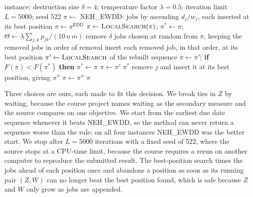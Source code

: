 \begin{algorithm}[ht]
\caption{Iterated greedy for weighted tardiness, after Ruiz and St\"utzle~\cite{ruiz2008igwt}. $F = (Z, W)$ is compared lexicographically, and every insertion goes to the best position.}
\label{alg:ig}
\small
\begin{algorithmic}[1]
\Require instance; destruction size $\delta = 4$; temperature factor $\lambda = 0.5$; iteration limit $L = 5000$; seed 522
\State $\pi \gets$ NEH\_EWDD: jobs by ascending $d_j / w_j$, each inserted at its best position
 $\pi \gets \pi^{\mathrm{EDD}}$ \EndIf
\State $\pi \gets \textsc{LocalSearch}(\pi)$; \quad $\pi^{*} \gets \pi$; \quad $\Theta \gets \lambda \sum_{j,k} p_{jk} / (10\, n\, m)$
  \State remove $\delta$ jobs chosen at random from $\pi$, keeping the removed jobs in order of removal
  \State insert each removed job, in that order, at its best position
  \State $\pi' \gets \textsc{LocalSearch}$ of the rebuilt sequence
   $\pi \gets \pi'$; \textbf{if} $F(\pi) < F(\pi^{*})$ \textbf{then} $\pi^{*} \gets \pi$
   $\pi \gets \pi'$
  \EndIf
\EndFor
\State \Return $\pi^{*}$
\Statex
{}
  \Repeat
      \State remove $j$ and insert it at its best position, giving $\pi''$
       $\pi \gets \pi''$ \EndIf
    \EndFor
  \State \Return $\pi$
\EndFunction
\end{algorithmic}
\end{algorithm}

\sumpara Three choices are ours, each made to fit this decision. \sumparaend
\fin We break ties in $Z$ by waiting, because the course project names waiting as the secondary measure and the source compares on one objective. \fine
\fin We start from the earliest due date sequence whenever it beats NEH\_EWDD, so the method can never return a sequence worse than the rule; on all four instances NEH\_EWDD was the better start. \fine
\fin We stop after $L = 5000$ iterations with a fixed seed of 522, where the source stops at a CPU-time limit, because the course requires a rerun on another computer to reproduce the submitted result. \fine
\fin The best-position search times the jobs ahead of each position once and abandons a position as soon as its running pair $(Z, W)$ can no longer beat the best position found, which is safe because $Z$ and $W$ only grow as jobs are appended. \fine
